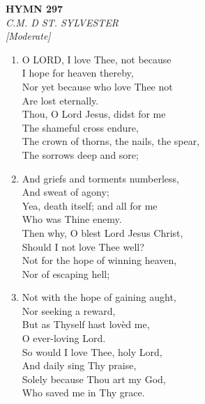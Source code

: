 \newpage
\begin{center}
    {\Large \textbf{HYMN 297}}
    \\
    \textit{C.M. D ST. SYLVESTER}
    \\
    \textit{\small [Moderate]}
\end{center}
\vspace{1em}

\begin{enumerate}
    \item O LORD, I love Thee, not because \\
        I hope for heaven thereby, \\
        Nor yet because who love Thee not \\
        Are lost eternally. \\
        Thou, O Lord Jesus, didst for me \\
        The shameful cross endure, \\
        The crown of thorns, the nails, the spear, \\
        The sorrows deep and sore;

    \item And griefs and torments numberless, \\
        And sweat of agony; \\
        Yea, death itself; and all for me \\
        Who was Thine enemy. \\
        Then why, O blest Lord Jesus Christ, \\
        Should I not love Thee well? \\
        Not for the hope of winning heaven, \\
        Nor of escaping hell;

    \item Not with the hope of gaining aught, \\
        Nor seeking a reward, \\
        But as Thyself hast lov\`ed me, \\
        O ever-loving Lord. \\
        So would I love Thee, holy Lord, \\
        And daily sing Thy praise, \\
        Solely because Thou art my God, \\
        Who saved me in Thy grace.

\end{enumerate}

